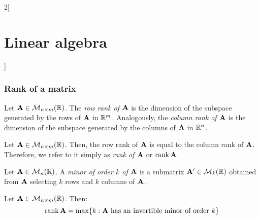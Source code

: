 \documentclass[../../../main.tex]{subfiles}
\begin{document}
\begin{multicols}{2}[\section{Linear algebra}]
\subsubsection*{Rank of a matrix}
\begin{definition}
    Let $\vb{A}\in\mathcal{M}_{n\times m}(\mathbb{R})$. The \textit{row rank of $\vb{A}$} is the dimension of the subspace generated by the rows of $\vb{A}$ in $\mathbb{R}^m$. Analogously, the \textit{column rank of $\vb{A}$} is the dimension of the subspace generated by the columns of $\vb{A}$ in $\mathbb{R}^n$.
\end{definition}
\begin{prop}
    Let $\vb{A}\in\mathcal{M}_{n\times m}(\mathbb{R})$. Then, the row rank of $\vb{A}$ is equal to the column rank of $\vb{A}$. Therefore, we refer to it simply as \textit{rank of $\vb{A}$} or $\rank\vb{A}$.
\end{prop}
\begin{definition}
    Let $\vb{A}\in\mathcal{M}_n(\mathbb{R})$. A \textit{minor of order $k$ of $\vb{A}$} is a submatrix $\vb{A}'\in\mathcal{M}_k(\mathbb{R})$ obtained from $\vb{A}$ selecting $k$ rows and $k$ columns of $\vb{A}$.
\end{definition}
\begin{prop}
    Let $\vb{A}\in\mathcal{M}_{n\times m}(\mathbb{R})$. Then:
     $$\rank\mathblack{A}=\max\{k:\text{$\mathblack{A}$\ has an invertible minor of order $k$}\}$$
\end{prop}

\end{multicols}
\end{document}
